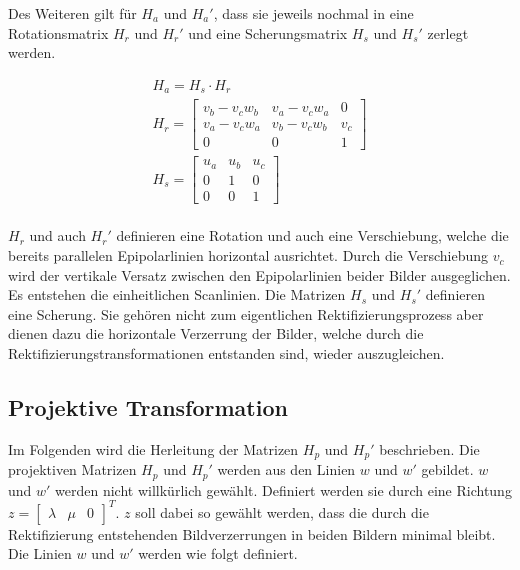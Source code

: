 Des Weiteren gilt für $H_a$ und $H_a'$, dass sie jeweils nochmal in eine Rotationsmatrix $H_r$ und $H_r'$ und eine Scherungsmatrix $H_s$ und $H_s'$ zerlegt werden\cite{ZZ,phdextrinsicPara}.


\begin{gather}
	H_a = H_s \cdot H_r\\
	H_r = 
	\begin{bmatrix}
		v_b-v_cw_b&	v_a-v_cw_a&0\\
		v_a-v_cw_a&v_b-v_cw_b&v_c\\
		0&0&1
	\end{bmatrix} \label{eq:DefHr}\\
	H_s = 
	\begin{bmatrix}
		u_a&u_b&u_c\\
		0&1&0\\
		0&0&1
	\end{bmatrix}\label{eq:DefHs}
\end{gather}\\

$H_r$ und auch $H_r'$ definieren eine Rotation und auch eine Verschiebung, welche die bereits parallelen Epipolarlinien horizontal ausrichtet. Durch die Verschiebung $v_c$ wird der vertikale Versatz zwischen den Epipolarlinien beider Bilder ausgeglichen. Es entstehen die einheitlichen Scanlinien. Die Matrizen $H_s$ und $H_s'$ definieren eine Scherung. 
Sie gehören nicht zum eigentlichen Rektifizierungsprozess aber dienen dazu die horizontale Verzerrung der Bilder, welche durch die Rektifizierungstransformationen entstanden sind, wieder auszugleichen. 

%

\subsection{Projektive Transformation}

Im Folgenden wird die Herleitung der Matrizen $H_p$ und $H_p'$ beschrieben. Die projektiven Matrizen $H_p$ und $H_p'$ werden aus den Linien $w$ und $w'$ gebildet. $w$ und $w'$ werden nicht willkürlich gewählt. Definiert werden sie durch eine Richtung $z = \begin{bmatrix}
\lambda&\mu&0\end{bmatrix}^T$. $z$ soll dabei so gewählt werden, dass die durch die Rektifizierung entstehenden Bildverzerrungen in beiden Bildern minimal bleibt. Die Linien $w$ und $w'$ werden wie folgt definiert.

